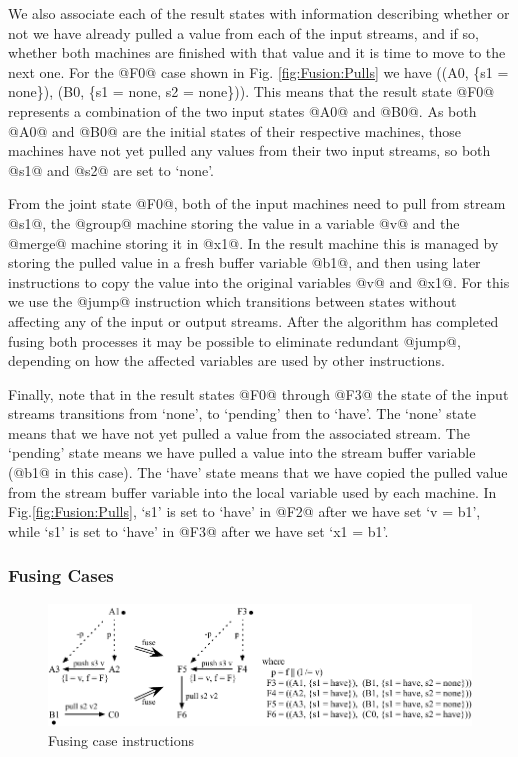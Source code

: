 We also associate each of the result states with information describing whether or not we have already pulled a value from each of the input streams, and if so, whether both machines are finished with that value and it is time to move to the next one. For the @F0@ case shown in Fig. \ref{fig:Fusion:Pulls} we have ((A0, \{s1 = none\}), (B0, \{s1 = none, s2 = none\})). This means that the result state @F0@ represents a combination of the two input states @A0@ and @B0@. As both @A0@ and @B0@ are the initial states of their respective machines, those machines have not yet pulled any values from their two input streams, so both @s1@ and @s2@ are set to `none'.

From the joint state @F0@, both of the input machines need to pull from stream @s1@, the @group@ machine storing the value in a variable @v@ and the @merge@ machine storing it in @x1@. In the result machine this is managed by storing the pulled value in a fresh buffer variable @b1@, and then using later instructions to copy the value into the original variables @v@ and @x1@. For this we use the @jump@ instruction which transitions between states without affecting any of the input or output streams. After the algorithm has completed fusing both processes it may be possible to eliminate redundant @jump@, depending on how the affected variables are used by other instructions.

Finally, note that in the result states @F0@ through @F3@ the state of the input streams transitions from `none', to `pending' then to `have'. The `none' state means that we have not yet pulled a value from the associated stream. The `pending' state means we have pulled a value into the stream buffer variable (@b1@ in this case). The `have' state means that we have copied the pulled value from the stream buffer variable into the local variable used by each machine. In Fig.\ref{fig:Fusion:Pulls},  `s1' is set to `have' in @F2@ after we have set `v = b1', while `s1' is set to `have' in @F3@ after we have set `x1 = b1'. 


\eject{}
\subsubsection{Fusing Cases}
\begin{figure}
\includegraphics[scale=1.1]{figures/fuse-case-pull.pdf}
\caption{Fusing case instructions}
\label{fig:Fusion:Case}
\end{figure}

